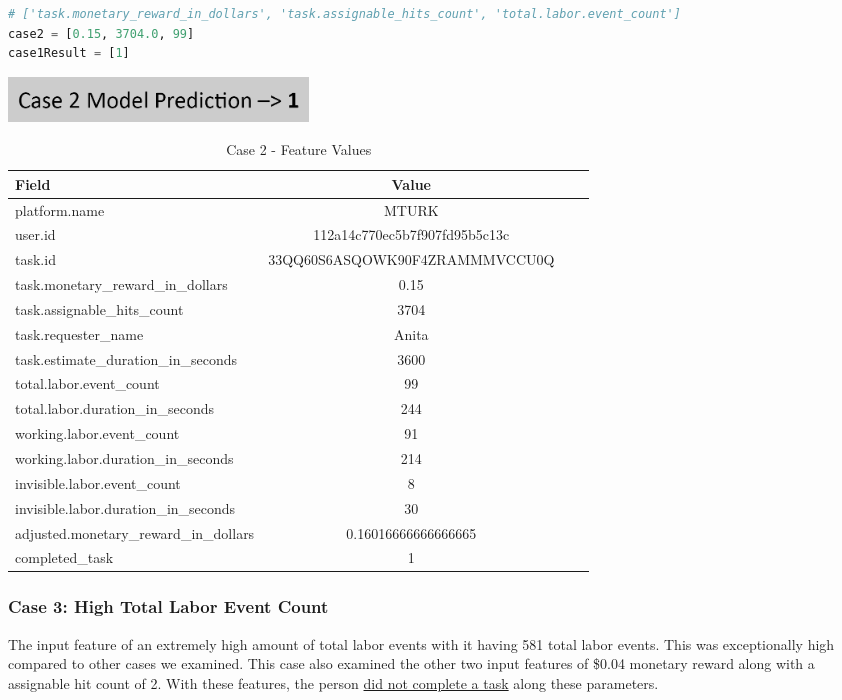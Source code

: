 \documentclass[11pt]{article}
\begin{document}
\begin{lstlisting}[language=Python]
# ['task.monetary_reward_in_dollars', 'task.assignable_hits_count', 'total.labor.event_count']
case2 = [0.15, 3704.0, 99]
case1Result = [1]
\end{lstlisting}

\includegraphics[width=0.35\textwidth, center]{figures/case-2-model-prediction}

\begin{table}[hbt!]
   \small
   \centering
   \begin{tabular}{lccr}
   \hline
   \textbf{Field} & \textbf{Value} \\
   \hline
   platform.name & MTURK \\
   user.id & 112a14c770ec5b7f907fd95b5c13c \\
   task.id & 33QQ60S6ASQOWK90F4ZRAMMMVCCU0Q \\
   task.monetary\_reward\_in\_dollars & 0.15		 \\
   task.assignable\_hits\_count & 3704 \\
   task.requester\_name & Anita \\
   task.estimate\_duration\_in\_seconds & 3600 \\
   total.labor.event\_count & 99 \\
   total.labor.duration\_in\_seconds & 244 \\
   working.labor.event\_count & 91 \\
   working.labor.duration\_in\_seconds & 214 \\
   invisible.labor.event\_count & 8 \\
   invisible.labor.duration\_in\_seconds & 30 \\
   adjusted.monetary\_reward\_in\_dollars & 0.16016666666666665 \\
   completed\_task & 1 \\
   \hline
   \end{tabular}
   \caption{Case 2 - Feature Values} 
\end{table}


\subsubsection{Case 3: High Total Labor Event Count}
The input feature of an extremely high amount of total labor events with it having 581 total labor events. This was exceptionally high compared to other cases we examined. This case also examined the other two input features of \$0.04 monetary reward along with a assignable hit count of 2. With these features, the person \underline{did not complete a task} along these parameters.
\end{document}
